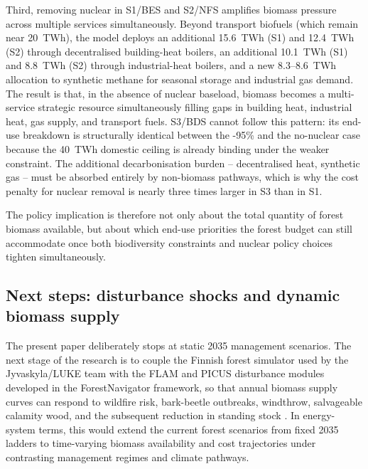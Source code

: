 \documentclass{article}
\begin{document}
Third, removing nuclear in S1/BES and S2/NFS amplifies biomass pressure across multiple services simultaneously. Beyond transport biofuels (which remain near 20~TWh), the model deploys an additional 15.6~TWh (S1) and 12.4~TWh (S2) through decentralised building-heat boilers, an additional 10.1~TWh (S1) and 8.8~TWh (S2) through industrial-heat boilers, and a new 8.3--8.6~TWh allocation to synthetic methane for seasonal storage and industrial gas demand. The result is that, in the absence of nuclear baseload, biomass becomes a multi-service strategic resource simultaneously filling gaps in building heat, industrial heat, gas supply, and transport fuels. S3/BDS cannot follow this pattern: its end-use breakdown is structurally identical between the -95\% and the no-nuclear case because the 40~TWh domestic ceiling is already binding under the weaker constraint. The additional decarbonisation burden -- decentralised heat, synthetic gas -- must be absorbed entirely by non-biomass pathways, which is why the cost penalty for nuclear removal is nearly three times larger in S3 than in S1.

The policy implication is therefore not only about the total quantity of forest biomass available, but about which end-use priorities the forest budget can still accommodate once both biodiversity constraints and nuclear policy choices tighten simultaneously.

\subsection{Next steps: disturbance shocks and dynamic biomass supply}

The present paper deliberately stops at static 2035 management scenarios. The next stage of the research is to couple the Finnish forest simulator used by the Jyvaskyla/LUKE team with the FLAM and PICUS disturbance modules developed in the ForestNavigator framework, so that annual biomass supply curves can respond to wildfire risk, bark-beetle outbreaks, windthrow, salvageable calamity wood, and the subsequent reduction in standing stock \citep{venalainenClimateChangeInduces2020,hlasnyDevastatingOutbreakBark2021,tothImpactsCalamityLogging2020}. In energy-system terms, this would extend the current forest scenarios from fixed 2035 ladders to time-varying biomass availability and cost trajectories under contrasting management regimes and climate pathways.
\end{document}
